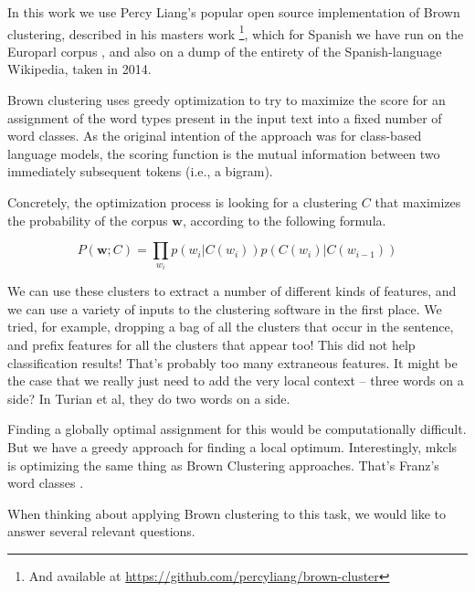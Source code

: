 In this work we use Percy Liang's popular open source implementation of Brown
clustering, described in his masters work \cite{Liang05semi-supervisedlearning}
\footnote{And available at \url{https://github.com/percyliang/brown-cluster}},
which for Spanish we have run on the Europarl corpus \cite{europarl}, and also
on a dump of the entirety of the Spanish-language Wikipedia, taken in 2014.

Brown clustering uses greedy optimization to try to maximize the score for an
assignment of the word types present in the input text into a fixed number of
word classes. As the original intention of the approach was for class-based
language models, the scoring function is the mutual information between two
immediately subsequent tokens (i.e., a bigram).

Concretely, the optimization process is looking for a clustering $C$ that
maximizes the probability of the corpus $\boldsymbol{w}$, according to the
following formula.

\begin{equation} \label{eq:brownclassprob}
P(\boldsymbol{w}; C) = \prod_{w_i} p(w_i | C(w_i)) p(C(w_i) | C(w_{i-1}))
\end{equation}

We can use these clusters to extract a number of different kinds of features,
and we can use a variety of inputs to the clustering software in the first
place.
We tried, for example, dropping a bag of all the clusters that occur in the
sentence, and prefix features for all the clusters that appear too!
This did not help classification results!
That's probably too many extraneous features.
It might be the case that we really just need to add the very local context --
three words on a side? In Turian et al, they do two words on a side.


Finding a globally optimal assignment for this would be computationally
difficult. But we have a greedy approach for finding a local optimum.
Interestingly, mkcls is optimizing the same thing as Brown Clustering
approaches. That's Franz's word classes \cite{och1999efficient}.

When thinking about applying Brown clustering to this task, we would like to
answer several relevant questions.

